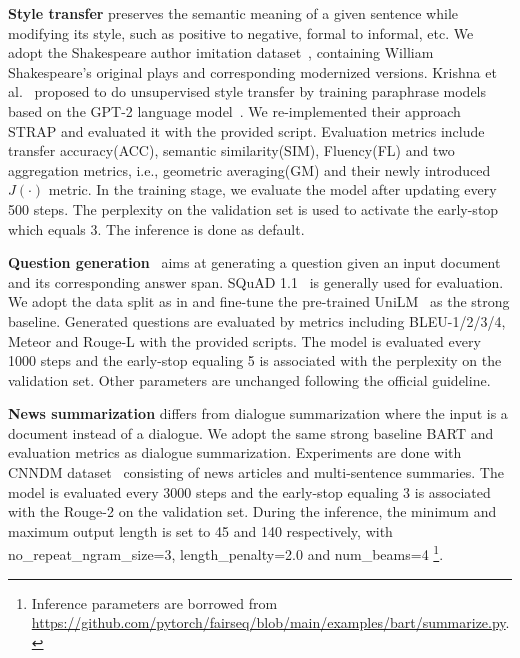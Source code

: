 \textbf{Style transfer} preserves the semantic meaning of a given sentence while modifying its style, such as positive to negative, formal to informal, etc.
We adopt the Shakespeare author imitation dataset~\cite{xu2012paraphrasing}, containing William Shakespeare's original plays and corresponding modernized versions. Krishna et al.~ proposed to do unsupervised style transfer by training paraphrase models based on the GPT-2 language model~\cite{radford2019language}. We re-implemented their approach STRAP %
and evaluated it with the provided script. Evaluation metrics include
transfer accuracy(ACC), semantic similarity(SIM), Fluency(FL) and two aggregation metrics, i.e., geometric averaging(GM) and their newly introduced $J(\cdot)$ metric. %
In the training stage, we evaluate the model after updating every 500 steps. The perplexity on the validation set is used to activate the early-stop which equals 3. The inference is done as default.
 
\textbf{Question generation}~\cite{zhou2017neural} aims at generating a question given an input document and its corresponding answer span. SQuAD 1.1~\cite{rajpurkar2016squad} is generally used for evaluation. We adopt the data split as in \cite{du2017learning} and fine-tune the pre-trained UniLM~\cite{dong2019unified} as the strong baseline. %
Generated questions are evaluated by metrics including BLEU-1/2/3/4, Meteor and Rouge-L with the provided scripts. The model is evaluated every 1000 steps and the early-stop equaling 5 is associated with the perplexity on the validation set. Other parameters are unchanged following the official guideline.

\textbf{News summarization} differs from dialogue summarization where the input is a document instead of a dialogue. We adopt the same strong baseline BART and evaluation metrics as dialogue summarization. Experiments are done with CNNDM dataset~\cite{HermannKGEKSB15} consisting of news articles and multi-sentence summaries. The model is evaluated every 3000 steps and the early-stop equaling 3 is associated with the Rouge-2 on the validation set. During the inference, the minimum and maximum output length is set to 45 and 140 respectively, with no\_repeat\_ngram\_size=3, length\_penalty=2.0 and num\_beams=4 \footnote{Inference parameters are borrowed from \url{https://github.com/pytorch/fairseq/blob/main/examples/bart/summarize.py}.}.

